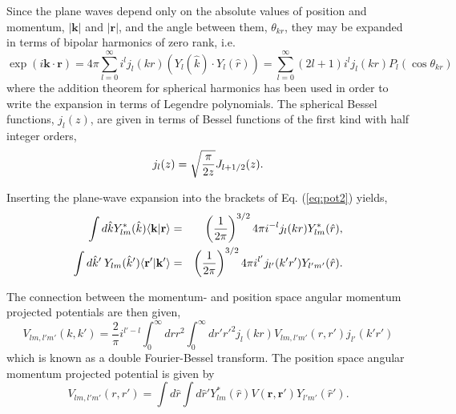 \documentclass[%
oneside,                 %
final,                   %
10pt]{article}
\begin{document}
Since the plane waves depend only on the absolute values of position and momentum, $\vert\mathbf{k}\vert$ and 
$\vert\mathbf{r}\vert$,
and the angle between them, $\theta_{kr}$, they may be expanded in terms of bipolar harmonics of 
zero rank, i.e.  
\[ 
  \exp{(i \mathbf{k}\cdot \mathbf{r})} = 4\pi\sum_{l=0}^{\infty} i^l j_l(kr)\left( Y_l(\hat{k}) \cdot Y_l(\hat{r}) \right)= \sum_{l=0}^{\infty} (2l+1)i^l j_l(kr) P_l(\cos \theta_{kr}) 
\]
where the addition theorem for spherical harmonics has been used in order to write
the expansion in terms of Legendre polynomials. The spherical Bessel functions, $j_l(z)$,  
are given in terms of Bessel functions of the first kind with half integer orders,  
\[
j_l(z) = \sqrt{\pi \over 2 z} J_{l+1/2}(z).  
\]

Inserting the plane-wave expansion
into the brackets of Eq. (\ref{eq:pot2}) yields, 
\begin{eqnarray*}
  \nonumber
  \int d{\hat{k}}  Y_{lm}^*(\hat{k})\langle \mathbf{k}\vert \mathbf{r} \rangle & = &  
  \left( {1\over 2\pi} \right) ^{3/2}4\pi i^{-l} j_l(kr) Y_{lm}^*(\hat{r}), \\  
  \nonumber
  \int d{\hat{k}'}\:   Y_{lm}(\hat{k}') \langle \mathbf{r'}\vert \mathbf{k}' \rangle & = &  
  \left( {1\over 2\pi} \right) ^{3/2}4\pi i^{l'} j_{l'}(k'r') Y_{l'm'}(\hat{r}). 
\end{eqnarray*}

The connection between the momentum- and position space angular momentum 
projected potentials are then given, 
\[
  V_{lm, l'm'}(k,k')=\frac{2}{\pi}i^{l'-l}\int_0^\infty drr^2 \int_0^\infty dr'{r'}^2j_l(kr) V_{lm,l'm'}(r,r') j_{l'}(k'r')
  \label{eq:pot3}
\]
which is known as a double Fourier-Bessel transform. The position space angular 
momentum projected potential is given by
\[
  V_{lm, l'm'}(r,r') = \int d{\hat{r}} \int d{\hat{r}'}Y_{lm}^*(\hat{r})V(\mathbf{r}, \mathbf{r'})Y_{l'm'}(\hat{r}').
  \label{eq:pot4}
\]
\end{document}
